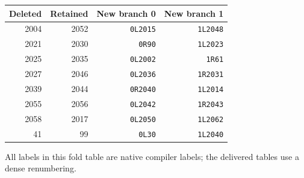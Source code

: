 \begin{center}\small
\begin{tabular}{@{}rrrr@{}}\toprule
Deleted & Retained & New branch 0 & New branch 1\\\midrule
2004 & 2052 & \texttt{0L2015} & \texttt{1L2048}\\
2021 & 2030 & \texttt{0R90} & \texttt{1L2023}\\
2025 & 2035 & \texttt{0L2002} & \texttt{1R61}\\
2027 & 2046 & \texttt{0L2036} & \texttt{1R2031}\\
2039 & 2044 & \texttt{0R2040} & \texttt{1L2014}\\
2055 & 2056 & \texttt{0L2042} & \texttt{1R2043}\\
2058 & 2017 & \texttt{0L2050} & \texttt{1L2062}\\
41 & 99 & \texttt{0L30} & \texttt{1L2040}\\
\bottomrule\end{tabular}
\end{center}
All labels in this fold table are native compiler labels; the delivered tables use a dense renumbering.
